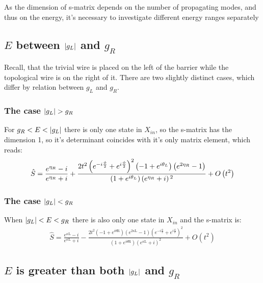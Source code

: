 As the dimension of  s-matrix depends on the number of propagating modes, and thus on the energy, it's necessary to investigate different energy ranges separately 
\subsection{$ E $ \hspace{0pt} between $ \left|g_L\right| $ and $ g_R $}
	
Recall, that the trivial wire is placed on the left of the barrier while the topological wire is on the right of it. There are two slightly distinct cases, which differ by relation between $ g_L $ and $ g_R $.
\subsubsection{The case $ \left|g_L\right| > g_R $}

For $ g_R<E<\left|g_L\right| $ there is only one state in $ X_{in} $, so the s-matrix has the dimension 1, so it's determinant coincides with it's only matrix element, which reads:
\begin{gather}
\hat{S}
=
\frac{e^{\eta _R}-i}{e^{\eta _R}+i}
+
	\frac{2 t^2  \left(e^{-i \frac{\phi}{2} }+e^{i \frac{\phi}{2} }\right)^2 \left(-1+e^{i \theta _L}\right) \left(e^{2 \eta _R}-1\right)}{\left(1+e^{i \theta _L}\right) \left(e^{\eta _R}+i\right){}^2}
	+
	O\left(t^2\right)
\end{gather}
\subsubsection{The case $ \left|g_L\right| < g_R $}
When $ \left|g_L\right|<E<g_R $ there is also only one state in $ X_{in} $ and the s-matrix is:
\begin{gather}
\hat{S}
=
	\frac{e^{\text{$\kappa $L}}-i}{e^{\text{$\kappa $L}}+i}
	-
	\frac{2 t^2 
		\left(-1+e^{i \text{$\theta $R}}\right) \left(e^{2 \text{$\kappa $L}}-1\right)  \left(e^{-i \frac{\phi}{2} }+e^{i \frac{\phi}{2} }\right)^2
	}{\left(1+e^{i \text{$\theta $R}}\right) \left(e^{\text{$\kappa $L}}+i\right)^2}
	+O\left(t^2\right)
\end{gather}

\subsection{$ E $ \hspace{0pt} is greater than both $ \left|g_L\right| $ and $ g_R $}

